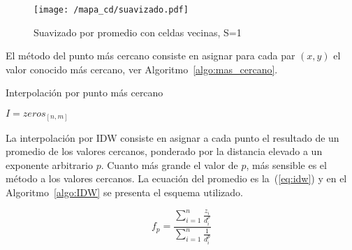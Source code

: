 \begin{figure}[h!]
    \centering
    \texttt{[image: /mapa\_cd/suavizado.pdf]}
    \caption{Suavizado por promedio con celdas vecinas, S=1}\label{fig:suavizado_promedio}
\end{figure}


El método del punto más cercano consiste en asignar para cada par $(x, y)$ el
valor conocido más cercano, ver Algoritmo~\ref{algo:mas_cercano}.

\begin{algorithm}
 \caption{Interpolación por punto más cercano}\label{algo:mas_cercano}


    \BlankLine
     $I=zeros_{[n,m]}$\;
\end{algorithm}

La interpolación por IDW consiste en asignar a cada punto el resultado de un
promedio de los valores cercanos, ponderado por la distancia elevado a un
exponente arbitrario $p$.
%
Cuanto más grande el valor de $p$, más sensible es el método a los valores
cercanos.
%
La ecuación del promedio es la~(\ref{eq:idw}) y en el Algoritmo~\ref{algo:IDW}
se presenta el esquema utilizado.
%

\begin{equation} \label{eq:idw}
    f_p = \frac{\sum_{i=1}^{n} \frac{z_i}{d_i^p}} {\sum_{i=1}^{n}
    \frac{1}{d_i^p}}
\end{equation}


